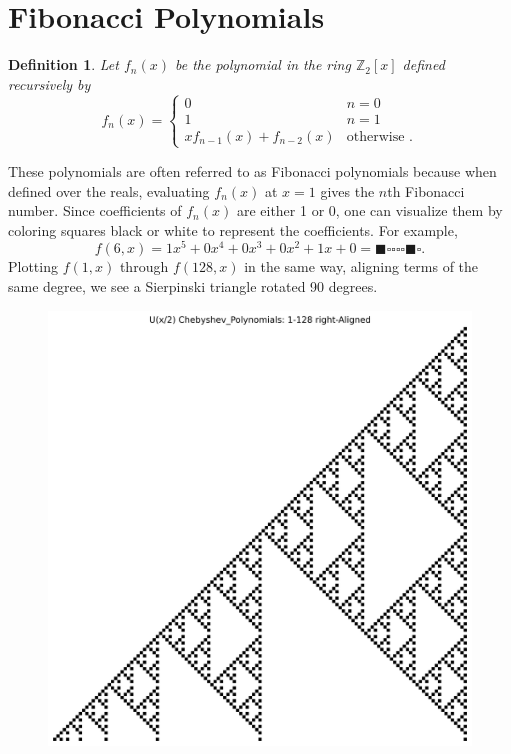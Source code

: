 \documentclass[a4paper]{article}
\newtheorem{definition}{Definition}
\newcommand{\Z}{\mathbb{Z}}
\begin{document}
	\section{Fibonacci Polynomials}
	\begin{definition}
		Let $f_n(x)$ be the polynomial in the ring $\Z_2[x]$ defined recursively by
		\begin{equation*}
			f_n(x) = \begin{cases}
				0 & n=0 \\
				1 & n=1 \\
				xf_{n-1}(x) + f_{n-2}(x) & \text{otherwise }.
			\end{cases}
		\end{equation*}
	\end{definition}
	These polynomials are often referred to as Fibonacci polynomials because when defined over the reals, evaluating $f_n(x)$ at $x=1$ gives the $n$th Fibonacci number.
	Since coefficients of $f_n(x)$ are either 1 or 0, one can visualize them by coloring squares black or white to represent the coefficients.
	For example,
	\begin{equation*}
		f(6,x) = 1x^5 + 0x^4 + 0x^3 + 0x^2 + 1x + 0 = \blacksquare\square\square\square\square\blacksquare\square.
	\end{equation*}
	Plotting $f(1,x)$ through $f(128,x)$ in the same way, aligning terms of the same degree, we see a Sierpinski triangle rotated 90 degrees.
	
	\begin{figure}[H]
		\centering
		\includegraphics[width=.8\textwidth]{../../code/serialization/chebyshev/chebyshev1_right_128.png}	
	\end{figure}
	
\end{document}
